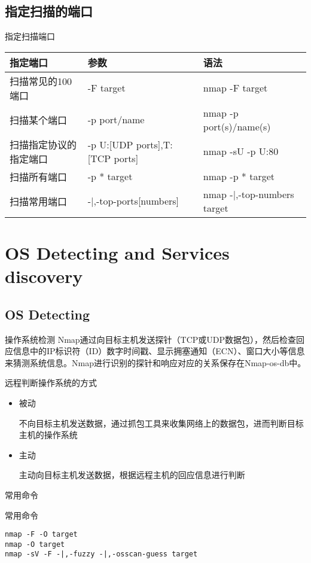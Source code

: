 \documentclass{beamer}
\begin{document}
\subsection{指定扫描的端口}
\begin{frame}
\end{frame}
\begin{frame}{指定扫描端口}
\begin{table}
\begin{tabular}{p{2.5cm}p{4cm}l}
\toprule
\textbf{指定端口}&\textbf{参数}&\textbf{语法}\\
\midrule
扫描常见的100端口&-F target& nmap -F target\\
扫描某个端口&-p port/name& nmap -p port(s)/name(s)\\

扫描指定协议的指定端口&-p U:[UDP ports],T:[TCP ports] & nmap -sU -p U:80\\
扫描所有端口&-p * target& nmap -p * target\\
扫描常用端口&-|,-top-ports[numbers]& nmap -|,-top-numbers target\\
\bottomrule
\end{tabular}
\end{table}
\end{frame}
\section{OS Detecting and Services discovery}
\begin{frame}
\end{frame}
\subsection{OS Detecting}
\begin{frame}
\end{frame}
\begin{frame}{操作系统检测}
Nmap通过向目标主机发送探针（TCP或UDP数据包），然后检查回应信息中的IP标识符（ID）数字时间戳、显示拥塞通知（ECN）、窗口大小等信息来猜测系统信息。Nmap进行识别的探针和响应对应的关系保存在Nmap-os-db中。
\begin{block}{远程判断操作系统的方式}
\begin{itemize}
\item
被动

不向目标主机发送数据，通过抓包工具来收集网络上的数据包，进而判断目标主机的操作系统
\item
主动

主动向目标主机发送数据，根据远程主机的回应信息进行判断
\end{itemize}
\end{block}
\end{frame}
\begin{frame}[fragile]{常用命令}
\begin{block}{常用命令}
\begin{verbatim}
nmap -F -O target
nmap -O target
nmap -sV -F -|,-fuzzy -|,-osscan-guess target
\end{verbatim}
\end{block}
\end{frame}
\end{document}
